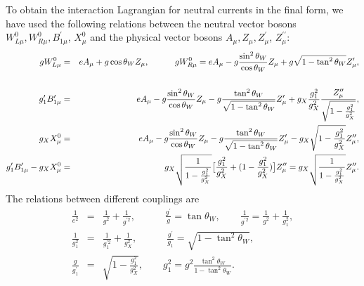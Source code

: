 \documentclass{ws-ijmpa}
\begin{document}
To obtain the interaction Lagrangian for neutral currents in the final form, we have used the following relations between the neutral vector bosons $W^{0}_{L \mu}, W^{0}_{R \mu}, B_{1 \mu}^{\prime}$, $X^{0}_{\mu}$ and the physical vector bosons $A_{\mu}, Z_{\mu}, Z^{\prime}_{\mu}$, $Z^{\prime\prime}_{\mu}$:
\begin{eqnarray}
gW^{0}_{L \mu}&=& eA_{\mu}+g\cos\theta_{W}Z_{\mu}, \quad\quad\quad gW^{0}_{R \mu} = eA_{\mu}-g\frac{\sin^{2}\theta_W}{\cos\theta_{W}}Z_{\mu}+g\sqrt{1-\tan^{2}\theta_W}Z^{\prime}_{\mu},\notag\\
\label{boson-relations1}\\
g^{\prime}_1B^{\prime}_{1 \mu} &=& eA_{\mu}-g\frac{\sin^{2}\theta_W}{\cos\theta_{W}}Z_{\mu}-g\frac{\tan^{2}\theta_W}{\sqrt{1-\tan^{2}\theta_W}}Z^{\prime}_{\mu}+g_{X}\frac{g^{2}_1}{g^{2}_X}\frac{Z^{\prime \prime}_{\mu}}{\sqrt{1-\frac{g^{2}_1}{g^{2}_X}}}\label{bosn-relations2},\\
g_{X}X^{0}_{\mu} &=& eA_{\mu}-g\frac{\sin^{2}\theta_W}{\cos\theta_{W}}Z_{\mu}-g\frac{\tan^{2}\theta_W}{\sqrt{1-\tan^{2}\theta_W}}Z^{\prime}_{\mu}-g_{X}\sqrt{1-\frac{g^{2}_1}{g^{2}_X}}Z^{\prime \prime}_{\mu}\label{bosn-relations3},\\
g^{\prime}_{1}B^{\prime}_{1\mu}-g_{X}X^{0}_{\mu} &=& g_{X}\sqrt{\frac{1}{1-\frac{g^{2}_1}{g^2_{X}}}} \big[\frac{g^{2}_1}{g^2_{X}}+(1-\frac{g^{2}_1}{g^{2}_X})\big]Z^{\prime\prime}_{\mu} = g_{X}\sqrt{\frac{1}{1-\frac{g^{2}_1}{g^2_{X}}}}Z^{\prime\prime}_{\mu}\label{bosn-relations4}.
\end{eqnarray}
The relations between different couplings are
\begin{eqnarray}
\frac{1}{e^2} &=&\frac{1}{g^2}+\frac{1}{g^{\prime 2}}, \quad\quad\quad \frac{g^{\prime}}{g} = \tan\theta_W,\quad\quad \frac{1}{g^{\prime 2}} =\frac{1}{g^2}+\frac{1}{g_{1}^{2}},\nonumber \\
\frac{1}{g_1^{2}} & = & \frac{1}{g_{1}^{\prime 2}}+\frac{1}{g_{X}^{2}}, \quad\quad\quad\frac{g^{\prime}}{g_{1}} =\sqrt{1-\tan^{2}\theta_W},\nonumber \\
\frac{g}{g^{\prime}_{1}} &=& \sqrt{1-\frac{g^{2}_1}{g^2_{X}}},\quad\quad g^{2}_1 = g^2\frac{\tan^{2}\theta_W}{1-\tan^{2}\theta_W}\label{coupling-relations} .
\end{eqnarray}
\end{document}
